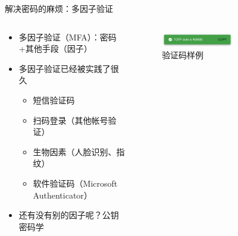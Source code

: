 \documentclass[aspectratio=169]{ctexbeamer}
\begin{document}
\begin{frame}{解决密码的麻烦：多因子验证} %
  \begin{columns}
    \begin{column}{0.5\textwidth}
      \begin{itemize}
        \item<1-> 多因子验证（MFA）：密码+其他手段（因子）
        \item<2-> 多因子验证已经被实践了很久\begin{itemize}
          \item 短信验证码
          \item 扫码登录（其他帐号验证）
          \item 生物因素（人脸识别、指纹）
          \item 软件验证码（Microsoft Authenticator）
        \end{itemize}
        \item<3-> 还有没有别的因子呢？公钥密码学
      \end{itemize}
    \end{column}
    \begin{column}{0.5\textwidth}
      \begin{figure}
        \centering
        \includegraphics[width=0.6\textwidth]{img/totp.png}
        \caption{验证码样例}
      \end{figure}
    \end{column}
  \end{columns}
\end{frame}
\end{document}
